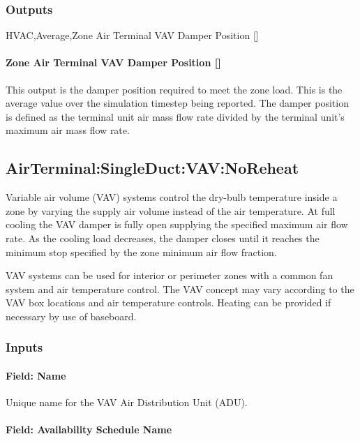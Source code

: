 \subsubsection{Outputs}\label{outputs-4}

HVAC,Average,Zone Air Terminal VAV Damper Position {[]}

\paragraph{Zone Air Terminal VAV Damper Position {[]}}\label{zone-air-terminal-vav-damper-position-2}

This output is the damper position required to meet the zone load. This is the average value over the simulation timestep being reported. The damper position is defined as the terminal unit air mass flow rate divided by the terminal unit's maximum air mass flow rate.

\subsection{AirTerminal:SingleDuct:VAV:NoReheat}\label{airterminalsingleductvavnoreheat}

Variable air volume (VAV) systems control the dry-bulb temperature inside a zone by varying the supply air volume instead of the air temperature. At full cooling the VAV damper is fully open supplying the specified maximum air flow rate. As the cooling load decreases, the damper closes until it reaches the minimum stop specified by the zone minimum air flow fraction.

VAV systems can be used for interior or perimeter zones with a common fan system and air temperature control. The VAV concept may vary according to the VAV box locations and air temperature controls. Heating can be provided if necessary by use of baseboard.

\subsubsection{Inputs}\label{inputs-5-000}

\paragraph{Field: Name}\label{field-name-5-000}

Unique name for the VAV Air Distribution Unit (ADU).

\paragraph{Field: Availability Schedule Name}\label{field-availability-schedule-name-5}

